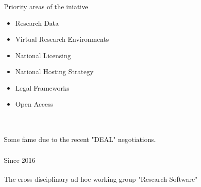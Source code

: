 \documentclass{beamer}
\begin{document}
\begin{frame}
  \frametitle{}
    \begin{block}{}
      \begin{center}
        Priority areas of the iniative\\
        \begin{itemize}
        \item Research Data
        \item Virtual Research Environments
        \item National Licensing
        \item National Hosting Strategy
        \item Legal Frameworks
        \item Open Access
        \end{itemize}
        \ \\ \ \\
        \pause Some fame due to the recent "DEAL" negotiations.
      \end{center}
    \end{block}
\end{frame}

\begin{frame}
  \frametitle{}
    \begin{block}{}
      \begin{center}
        Since 2016\\ \ \\
        The cross-disciplinary ad-hoc working group "Research Software"
      \end{center}
    \end{block}
\end{frame}
\end{document}
